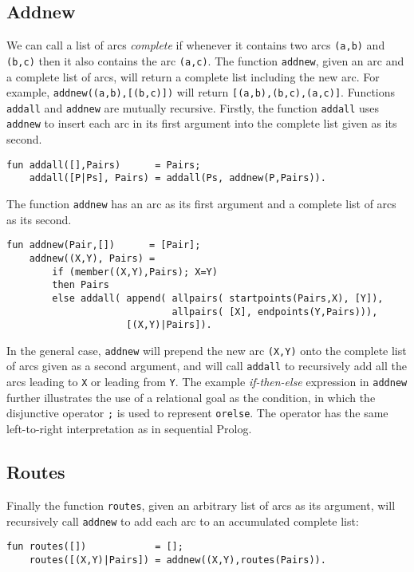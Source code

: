 \subsection{Addnew}

We can call a list of arcs \textit{complete} if whenever it contains two arcs
\texttt{(a,b)} and \texttt{(b,c)} then it also contains the arc \texttt{(a,c)}.
The function \texttt{addnew}, given an arc and a complete list of arcs, will return
a complete list including the new arc.  For example, \texttt{addnew((a,b),[(b,c)])}
will return \texttt{[(a,b),(b,c),(a,c)]}.
Functions \texttt{addall} and \texttt{addnew} are mutually recursive.  Firstly,
the function \texttt{addall} uses \texttt{addnew} to insert each arc in its first
argument into the complete list given as its second.
\begin{verbatim}
fun addall([],Pairs)      = Pairs;
    addall([P|Ps], Pairs) = addall(Ps, addnew(P,Pairs)).
\end{verbatim}
The function \texttt{addnew}
has an arc as its first argument and a complete list of arcs as its second.
\begin{verbatim}
fun addnew(Pair,[])      = [Pair];
    addnew((X,Y), Pairs) =
        if (member((X,Y),Pairs); X=Y)
        then Pairs
        else addall( append( allpairs( startpoints(Pairs,X), [Y]),
                             allpairs( [X], endpoints(Y,Pairs))),
                     [(X,Y)|Pairs]).
\end{verbatim}
In the general case, \texttt{addnew} will prepend the new arc \texttt{(X,Y)} onto the complete
list of arcs given as a second argument, and will call \texttt{addall} to
recursively add all the arcs leading to \texttt{X} or leading from \texttt{Y}.  The
example \textit{if-then-else} expression in \texttt{addnew} further illustrates the
use of a relational goal as the condition, in which the disjunctive operator \texttt{;} is
used to represent \texttt{orelse}.  The operator has the same left-to-right interpretation
as in sequential Prolog.

\subsection{Routes}

Finally the function \texttt{routes}, given an arbitrary list of arcs as its argument,
will recursively call \texttt{addnew} to add each arc to an accumulated complete
list:
\begin{verbatim}
fun routes([])            = [];
    routes([(X,Y)|Pairs]) = addnew((X,Y),routes(Pairs)).
\end{verbatim}


